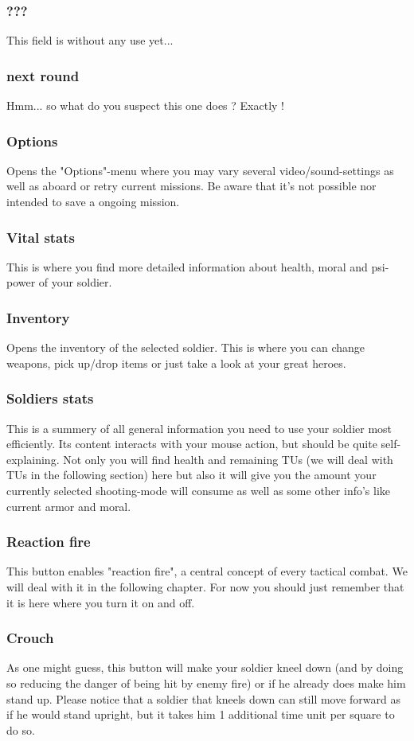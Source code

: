 \subsubsection{???}
This field is without any use yet...
\subsubsection{next round}
Hmm... so what do you suspect this one does ? Exactly !
\subsubsection{Options}
Opens the "Options"-menu where you may vary several video/sound-settings as well as aboard or retry current missions. Be aware that it's not possible nor intended to save a ongoing mission.
\subsubsection{Vital stats}
This is where you find more detailed information about health, moral and psi-power of your soldier.
\subsubsection{Inventory}
Opens the inventory of the selected soldier. This is where you can change weapons, pick up/drop items or just take a look at your great heroes.
\subsubsection{Soldiers stats}
This is a summery of all general information you need to use your soldier most efficiently. Its content interacts with your mouse action, but should be quite self-explaining. Not only you will find health and remaining TUs (we will deal with TUs in the following section) here but also it will give you the amount your currently selected shooting-mode will consume as well as some other info's like current armor and moral.
\subsubsection{Reaction fire}
This button enables "reaction fire", a central concept of every tactical combat. We will deal with it in the following chapter. For now you should just remember that it is here where you turn it on and off.
\subsubsection{Crouch}
As one might guess, this button will make your soldier kneel down (and by doing so reducing the danger of being hit by enemy fire) or if he already does make him stand up. Please notice that a soldier that kneels down can still move forward as if he would stand upright, but it takes him 1 additional time unit per square to do so.

